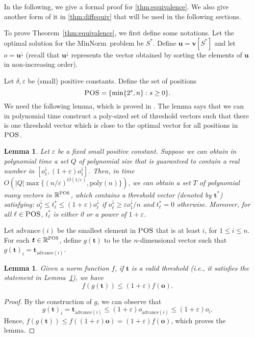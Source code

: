 \documentclass[11pt,a4paper]{article} \usepackage{enumitem}
\newcommand{\da}{\downarrow}
\newcommand{\boldu}{\boldsymbol{u}}
\newcommand{\boldv}{\boldsymbol{v}}
\newcommand{\boldt}{\boldsymbol{t}}
\newcommand{\boldo}{\boldsymbol{o}}
\newcommand{\minnorm}{\textsf{MinNorm}}
\newcommand{\R}{\mathbb{R}}
\newcommand{\POS}{\textsc{POS}}
\newtheorem{lemma}[theorem]{Lemma}
\theoremstyle{definition}
\begin{document}
In the following, we give a formal proof for \cref{thm:equivalence}.
We also give another form of it in \cref{thm:diffequiv} that will be used in the following sections.

To prove Theorem~\ref{thm:equivalence}, we first define 
some notations.
Let the optimal solution for the \minnorm\ problem be $S^*$. Define $\boldu = \boldv[S^*]$ and let $o = \boldu^{\da}$ (recall that $\boldu^{\da}$ represents the vector obtained by sorting the elements of $\boldu$ in non-increasing order).

Let $\delta,\varepsilon$ be (small) positive constants. 
Define the set of positions
$$
\POS=\{\min\{2^s,n\}:s\geq 0\}.
$$
We need the following lemma, which is proved in \cite{chakrabarty2019approximation}.
The lemma says that we can in polynomial time construct a poly-sized set 
of threshold vectors such that there is one threshold vector
which is close to the optimal vector for all positions in $\POS$.

\begin{lemma}
\label{lm:polyguess}
\cite{chakrabarty2019approximation}
Let $\varepsilon$ be a fixed small positive constant. Suppose we can obtain in polynomial time a set $Q$ of polynomial size that is guaranteed to contain a real number in $[o_1^\da,(1+\varepsilon)o_1^\da]$.
Then, in time $O\left(|Q|\max\{(n/\varepsilon)^{O(1/\varepsilon)},\text{poly}(n)\}\right)$, we can obtain a set $T$ of polynomial many vectors in $\R^{\POS}$, which contains a threshold vector (denoted by $\boldsymbol{t}^*$) satisfying:
$o_\ell^\da\leq t^*_\ell\leq (1+\varepsilon)o_\ell^\da$ if $o_\ell^\da\geq \varepsilon o_1^\da/n$ and $t^*_\ell=0$ otherwise.
Moreover, for all $\ell\in \POS$,
$t^*_\ell$ is either 0 or a power of $1+\varepsilon$.
\end{lemma}

Let $\text{advance}(i)$ be the smallest element in $\POS$ that is at least $i$, for 
$1\leq i\leq n$.
For each $\boldt\in\R^\POS$, define $g(\boldt)$ to be the $n$-dimensional vector such that $g(\boldt)_i=\boldt_{\text{advance}(i)}$. 


\begin{lemma}
\label{lem:d-2}
Given a norm function $f$, if $\boldt$ is a valid threshold (i.e., it satisfies the statement in Lemma~\ref{lm:polyguess}), 
we have
$$f(g(\boldt))\leq (1+\varepsilon)f(\boldo).$$
\end{lemma}
\begin{proof}
By the construction of $g$, we can observe that
$$
g(\boldt)_i=\boldt_{\text{advance}(i)}\leq (1+\varepsilon)o_{\text{advance}(i)}
\leq (1+\varepsilon)o_{i}.
$$
Hence, $f(g(\boldt))\leq f((1+\varepsilon)\boldo)=(1+\varepsilon)f(\boldo)$,
which proves the lemma.
\end{proof}
\end{document}
